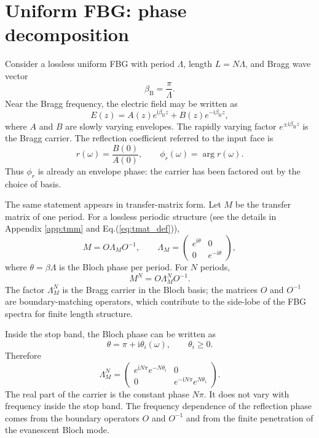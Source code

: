 \documentclass[aps,pra,twocolumn,superscriptaddress,nofootinbib]{revtex4-2}
\newcommand{\ii}{\mathrm{i}}
\newcommand{\B}{\mathrm{B}}
\begin{document}
\section{Uniform FBG: phase decomposition}
\label{sec:uniform}

Consider a lossless uniform FBG with period $\Lambda$, length $L=N\Lambda$, and Bragg wave vector
\begin{equation}
    \beta_\B=\frac{\pi}{\Lambda}.
\end{equation}
Near the Bragg frequency, the electric field may be written as
\begin{equation}
    E(z)=A(z)e^{\ii\beta_\B z}+B(z)e^{-\ii\beta_\B z},
\end{equation}
where $A$ and $B$ are slowly varying envelopes.  The rapidly varying factor $e^{\pm\ii\beta_\B z}$ is the Bragg carrier.  The reflection coefficient referred to the input face is
\begin{equation}
    r(\omega)=\frac{B(0)}{A(0)},\qquad \phi_r(\omega)=\arg r(\omega).
\end{equation}
Thus $\phi_r$ is already an envelope phase: the carrier has been factored out by the choice of basis.

The same statement appears in transfer-matrix form.  
Let $M$ be the transfer matrix of one period.  For a lossless periodic structure (see the details in Appendix \ref{app:tmm} and Eq.(\ref{eq:tmat_def})),
\begin{equation}
    M=O\Lambda_M O^{-1},\qquad
    \Lambda_M=\begin{pmatrix} e^{\ii\theta} & 0\\ 0 & e^{-\ii\theta}\end{pmatrix},
\end{equation}
where $\theta=\beta\Lambda$ is the Bloch phase per period.  For $N$ periods,
\begin{equation}
    M^N=O\Lambda_M^N O^{-1}.
\end{equation}
The factor $\Lambda_M^N$ is the Bragg carrier in the Bloch basis; the matrices $O$ and $O^{-1}$ are boundary-matching operators, which contribute to the side-lobe of the FBG spectra for finite length structure.

Inside the stop band, the Bloch phase can be written as
\begin{equation}
    \theta=\pi+\ii\theta_i(\omega),\qquad \theta_i\ge 0.
    \label{eq:stopband_theta}
\end{equation}
Therefore
\begin{equation}
    \Lambda_M^N=\begin{pmatrix}
    e^{\ii N\pi}e^{-N\theta_i} & 0\\
    0 & e^{-\ii N\pi}e^{N\theta_i}
    \end{pmatrix}.
\end{equation}
The real part of the carrier is the constant phase $N\pi$.  It does not vary with frequency inside the stop band.  The frequency dependence of the reflection phase comes from the boundary operators $O$ and $O^{-1}$ and from the finite penetration of the evanescent Bloch mode.
\end{document}
